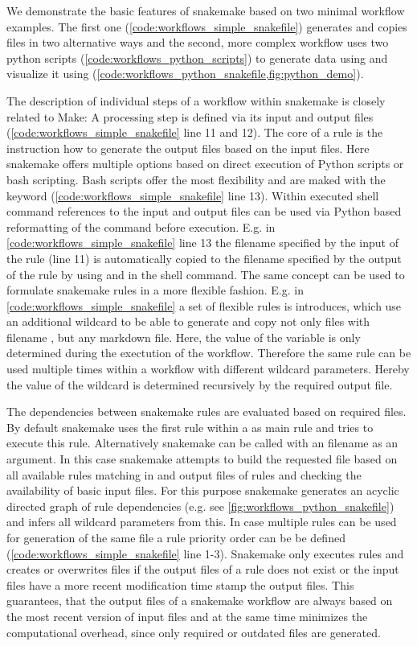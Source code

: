 We demonstrate the basic features of snakemake based on two minimal workflow examples. The first one (\cref{code:workflows_simple_snakefile}) generates and copies files in two alternative ways and the second, more complex workflow uses two python scripts (\cref{code:workflows_python_scripts}) to generate data using  and visualize it using  (\cref{code:workflows_python_snakefile,fig:python_demo}).

The description of individual steps of a workflow within snakemake is closely related to Make: A processing step is defined via its input and output files (\cref{code:workflows_simple_snakefile} line 11 and 12). The core of a rule is the instruction how to generate the output files based on the input files. Here snakemake offers multiple options based on direct execution of Python scripts or bash scripting. Bash scripts offer the most flexibility and are maked with the  keyword (\cref{code:workflows_simple_snakefile} line 13). Within executed shell command references to the input and output files can be used via Python based reformatting of the command before execution. E.g. in \cref{code:workflows_simple_snakefile} line 13 the filename specified by the input of the rule  (line 11) is automatically copied to the filename specified by the output of the rule by using  and  in the shell command. The same concept can be used to formulate snakemake rules in a more flexible fashion. E.g. in \cref{code:workflows_simple_snakefile} a set of flexible rules is introduces, which use an additional wildcard  to be able to generate and copy not only files with filename , but any markdown file. Here, the value of the variable  is only determined during the exectution of the workflow. Therefore the same rule can be used multiple times within a workflow with different wildcard parameters. Hereby the value of the wildcard is determined recursively by the required output file.

The dependencies between snakemake rules are evaluated based on required files. By default snakemake uses the first rule within a  as main rule and tries to execute this rule. Alternatively snakemake can be called with an filename as an argument. In this case snakemake attempts to build the requested file based on all available rules matching in and output files of rules and checking the availability of basic input files. For this purpose snakemake generates an acyclic directed graph of rule dependencies (e.g. see \cref{fig:workflows_python_snakefile}) and infers all wildcard parameters from this. In case multiple rules can be used for generation of the same file a rule priority order can be be defined (\cref{code:workflows_simple_snakefile} line 1-3). Snakemake only executes rules and creates or overwrites files if the output files of a rule does not exist or the input files have a more recent modification time stamp the output files. This guarantees, that the output files of a snakemake workflow are always based on the most recent version of input files and at the same time minimizes the computational overhead, since only required or outdated files are generated.

